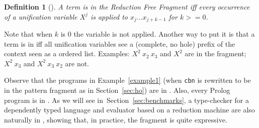 \documentclass{llncs}
\newtheorem{mydef}{Definition}
\begin{document}
\begin{mydef}[\rff{}]
A term is in the Reduction Free Fragment iff
every occurrence of a unification variable $X^j$ is applied to
$x_j \ldots x_{j+k-1}$ for $k >= 0$.
\end{mydef}

Note that when $k$ is $0$ the variable is not applied.  Another way to
put it is that a term is in \rff{} iff all unification variables see
a (complete, no hole) prefix of the \lp{} context seen as a ordered list.
Examples: $X^2~x_2~x_3$ and $X^2$ are in the fragment; $X^2~x_3$ and
$X^2~x_3~x_2$ are not.

Observe that the programs in Example~\ref{example1} (when \verb+cbn+ is
rewritten to be in the pattern fragment as in Section~\ref{sec:ho}) are in
\rff{}.  Also, every Prolog program is in \rff{}. As we will see
in~Section~\ref{sec:benchmarks}, a
type-checker for a dependently typed language
and evaluator based on a reduction machine are also naturally in \rff{},
showing that, in practice, the fragment is quite expressive.
\end{document}
